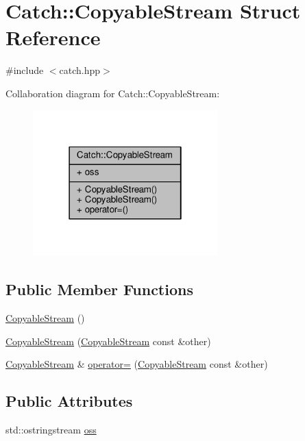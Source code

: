 \hypertarget{struct_catch_1_1_copyable_stream}{\section{Catch\-:\-:Copyable\-Stream Struct Reference}
\label{struct_catch_1_1_copyable_stream}
}


{\ttfamily \#include $<$catch.\-hpp$>$}



Collaboration diagram for Catch\-:\-:Copyable\-Stream\-:
\nopagebreak
\begin{figure}[H]
\begin{center}
\leavevmode
\includegraphics[width=202pt]{struct_catch_1_1_copyable_stream__coll__graph}
\end{center}
\end{figure}
\subsection*{Public Member Functions}
\begin{DoxyCompactItemize}
\item 
\hyperlink{struct_catch_1_1_copyable_stream_a5a61d0da675ae00cd46efaef4c445cdd}{Copyable\-Stream} ()
\item 
\hyperlink{struct_catch_1_1_copyable_stream_a0e72dc16240653f52c17106f4bf34da8}{Copyable\-Stream} (\hyperlink{struct_catch_1_1_copyable_stream}{Copyable\-Stream} const \&other)
\item 
\hyperlink{struct_catch_1_1_copyable_stream}{Copyable\-Stream} \& \hyperlink{struct_catch_1_1_copyable_stream_a1760fa29b38011c5845171260bec0966}{operator=} (\hyperlink{struct_catch_1_1_copyable_stream}{Copyable\-Stream} const \&other)
\end{DoxyCompactItemize}
\subsection*{Public Attributes}
\begin{DoxyCompactItemize}
\item 
std\-::ostringstream \hyperlink{struct_catch_1_1_copyable_stream_ae123fb4d673e7d7a13a3c5f6bc5d426c}{oss}
\end{DoxyCompactItemize}


